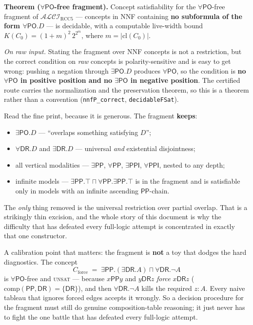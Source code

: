 \documentclass[11pt]{article}
\newcommand{\ALCIRCC}{\ensuremath{\mathcal{ALCI}_{\mathrm{RCC5}}}}
\newcommand{\DR}{\ensuremath{\mathsf{DR}}}
\newcommand{\PO}{\ensuremath{\mathsf{PO}}}
\newcommand{\PP}{\ensuremath{\mathsf{PP}}}
\newcommand{\PPI}{\ensuremath{\mathsf{PPI}}}
\newcommand{\Comp}{\mathrm{comp}}
\newcommand{\cl}{\mathrm{cl}}
\newcommand{\code}[1]{\texttt{#1}}
\begin{document}
\textbf{Theorem ($\forall\PO$-free fragment).} Concept satisfiability
for the $\forall\PO$-free fragment of $\ALCIRCC$ --- concepts in NNF
containing \textbf{no subformula of the form $\forall\PO.D$} --- is
decidable, with a computable live-width bound
$K(C_0)=(1+m)^2\,2^{2^m}$, where $m=|\cl(C_0)|$.

\smallskip
\emph{On raw input.} Stating the fragment over NNF concepts is not a
restriction, but the correct condition on \emph{raw} concepts is
polarity-sensitive and is easy to get wrong: pushing a negation through
$\exists\PO.D$ produces $\forall\PO$, so the condition is \textbf{no
$\forall\PO$ in positive position and no $\exists\PO$ in negative
position}. The certified route carries the normalization and the
preservation theorem, so this is a theorem rather than a convention
(\code{nnfP\_correct}, \code{decidableFSat}).

Read the fine print, because it is generous. The fragment
\textbf{keeps}:
\begin{itemize}
\item $\exists\PO.D$ --- ``overlaps something satisfying $D$'';
\item $\forall\DR.D$ and $\exists\DR.D$ --- universal \emph{and}
  existential disjointness;
\item all vertical modalities --- $\exists\PP$, $\forall\PP$,
  $\exists\PPI$, $\forall\PPI$, nested to any depth;
\item infinite models --- $\exists\PP.\top\sqcap\forall\PP.\exists\PP.\top$
  is in the fragment and is satisfiable only in models with an infinite
  ascending $\PP$-chain.
\end{itemize}

The \emph{only} thing removed is the universal restriction over partial
overlap. That is a strikingly thin excision, and the whole story of
this document is why the difficulty that has defeated every full-logic
attempt is concentrated in exactly that one constructor.

A calibration point that matters: the fragment is \textbf{not} a toy
that dodges the hard diagnostics. The concept
\[
C_{\mathrm{force}} \;=\; \exists\PP.(\exists\DR.A)\sqcap\forall\DR.\neg A
\]
is $\forall\PO$-free and \textsc{unsat} --- because
$x\mathbin{\PP}y$ and $y\mathbin{\DR}z$ \emph{force} $x\mathbin{\DR}z$
($\Comp(\PP,\DR)=\{\DR\}$), and then $\forall\DR.\neg A$ kills the
required $z\!:\!A$. Every naive tableau that ignores forced edges
accepts it wrongly. So a decision procedure for the fragment must still
do genuine composition-table reasoning; it just never has to fight the
one battle that has defeated every full-logic attempt.
\end{document}
